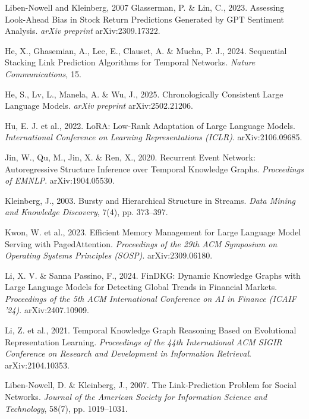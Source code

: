 \documentclass[a4paper,12pt]{report}
\begin{document}
\begin{thebibliography}{Liben-Nowell and Kleinberg, 2007}
Glasserman, P. \& Lin, C., 2023. Assessing Look-Ahead Bias in Stock Return
Predictions Generated by GPT Sentiment Analysis. {\em arXiv preprint}
arXiv:2309.17322.

He, X., Ghasemian, A., Lee, E., Clauset, A. \& Mucha, P. J., 2024. Sequential
Stacking Link Prediction Algorithms for Temporal Networks. {\em Nature
Communications}, 15.

He, S., Lv, L., Manela, A. \& Wu, J., 2025. Chronologically Consistent Large
Language Models. {\em arXiv preprint} arXiv:2502.21206.

Hu, E. J. et al., 2022. LoRA: Low-Rank Adaptation of Large Language Models. {\em
International Conference on Learning Representations (ICLR)}. arXiv:2106.09685.

Jin, W., Qu, M., Jin, X. \& Ren, X., 2020. Recurrent Event Network:
Autoregressive Structure Inference over Temporal Knowledge Graphs. {\em
Proceedings of EMNLP}. arXiv:1904.05530.

Kleinberg, J., 2003. Bursty and Hierarchical Structure in Streams. {\em Data
Mining and Knowledge Discovery}, 7(4), pp. 373--397.

Kwon, W. et al., 2023. Efficient Memory Management for Large Language Model
Serving with PagedAttention. {\em Proceedings of the 29th ACM Symposium on
Operating Systems Principles (SOSP)}. arXiv:2309.06180.

Li, X. V. \& Sanna Passino, F., 2024. FinDKG: Dynamic Knowledge Graphs with
Large Language Models for Detecting Global Trends in Financial Markets. {\em
Proceedings of the 5th ACM International Conference on AI in Finance (ICAIF
'24)}. arXiv:2407.10909.

Li, Z. et al., 2021. Temporal Knowledge Graph Reasoning Based on Evolutional
Representation Learning. {\em Proceedings of the 44th International ACM SIGIR
Conference on Research and Development in Information Retrieval}. arXiv:2104.10353.

Liben-Nowell, D. \& Kleinberg, J., 2007. The Link-Prediction Problem for Social
Networks. {\em Journal of the American Society for Information Science and
Technology}, 58(7), pp. 1019--1031.


\end{thebibliography}
\end{document}
